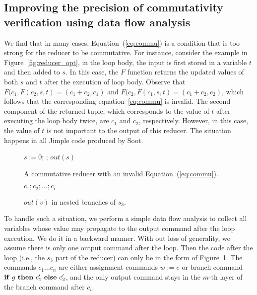 \documentclass{llncs}
\newcommand{\cur}{cur()}
\newcommand{\ite}[3]{
	 \ifmmode 
	 \mathbf{if}\ #1 \ \mathbf{then}\ #2\  \mathbf{else}\ #3 
	 \else
	 \textbf{if}\ #1 \ \textbf{then}\ #2\  \textbf{else}\ #3
	 \fi}
\begin{document}
\subsection{Improving the precision of commutativity verification using data flow analysis}
\label{section:opt1}
We find that in many cases, Equation~(\ref{eq:commu}) is a condition that is too strong for the reducer to be commutative. For instance, consider the example in Figure~\ref{fig:reducer_opt}, in the loop body, the input is first stored in a variable $t$ and then added to $s$. In this case, the $F$ function returns the updated values of both $s$ and $t$ after the execution of loop body. Observe that 
$F(c_1, F(c_2,s,t) = (c_1+c_2, c_1)$ and $F(c_2, F(c_1,s,t) = (c_1+c_2, c_2)$, which follows that the corresponding equation~\ref{eq:commu} is invalid. The second component of the returned tuple, which corresponds to the value of $t$ after executing the loop body twice, are $c_1$ and $c_2$, respectively. However, in this case, the value of $t$ is not important to the output of this reducer. The situation happens in all Jimple code produced by Soot.

\begin{figure}[hbt]
	\begin{minipage}{0.4\textwidth}
		\begin{algorithm}[H]
			$s:= 0$; \;
			\Loop{}{
				$t:=\cur$;
				$s:= s + t$\;
			};
			$out(s)$\;\;
		\end{algorithm}
		\caption{A commutative reducer with an invalid Equation~(\ref{eq:commu}).}
		\label{fig:reducer_opt}
	\end{minipage}
	\begin{minipage}{0.55\textwidth}
		\centering
		\begin{minipage}{0.75\textwidth}
		\begin{algorithm}[H]
			$c_1;c_2;\ldots;c_i$\;
			\lElse{ $\ldots$}
		\end{algorithm}
	\end{minipage}
		\caption{$out(v)$ in nested branches of $s_3$.}
		\label{fig:nested_out}
	\end{minipage}
\end{figure}


To handle such a situation, we perform a simple data flow analysis to collect all variables whose value may propagate to the output command after the loop execution. We do it in a backward manner.  With out loss of generality, we assume there is only one output command after the loop. Then the code after the loop (i.e., the $s_3$ part of the reducer) can only be in the form of Figure~\ref{fig:nested_out}.
The commands $c_1\ldots c_n$ are either assignment commands $w:=e$ or branch command $\ite{g}{c'_1}{c'_2}$, and the only output command stays in the $m$-th layer of the branch command after $c_i$.
\end{document}
